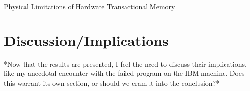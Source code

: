 \documentclass{article}
\begin{document}
\newcommand{\figuretitle}[1]{\textbf{#1}\\\vspace{2mm}}

\begin{center}
{\huge Physical Limitations of Hardware Transactional Memory}
\end{center}






\section{Discussion/Implications}
*Now that the results are presented, I feel the need to discuss their
implications, like my anecdotal encounter with the failed program on the IBM
machine. Does this warrant its own section, or should we cram it into the
conclusion?*


\end{document}
